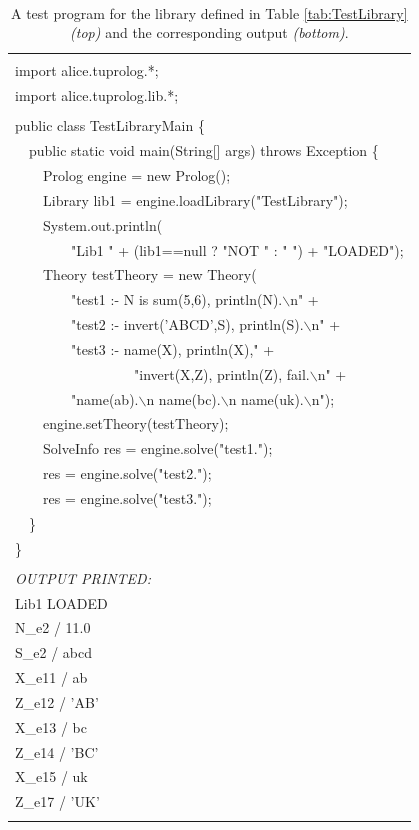 \begin{table}
    \begin{center}{\small\tt
    \begin{tabular}{p{12cm}}
     \hline\\
    import alice.tuprolog.*;\\
    import alice.tuprolog.lib.*;\\
    \\
    public class TestLibraryMain \{\\
    ~~public static void main(String[] args) throws Exception \{\\
	~~~~Prolog engine = new Prolog();\\
	~~~~Library lib1 = engine.loadLibrary("TestLibrary");\\
	~~~~System.out.println(\\
	~~~~~~~~"Lib1 " + (lib1==null ? "NOT " : " ") + "LOADED");\\
	~~~~Theory testTheory = new Theory(\\
	~~~~~~~~"test1 :- N is sum(5,6), println(N).$\backslash$n" +\\
	~~~~~~~~"test2 :- invert('ABCD',S), println(S).$\backslash$n" +\\
	~~~~~~~~"test3 :- name(X), println(X)," +\\
	~~~~~~~~~~~~~~~~~"invert(X,Z), println(Z), fail.$\backslash$n" +\\
	~~~~~~~~"name(ab).$\backslash$n name(bc).$\backslash$n name(uk).$\backslash$n");\\
	~~~~engine.setTheory(testTheory);\\
	~~~~SolveInfo res = engine.solve("test1.");\\
	~~~~res = engine.solve("test2.");\\
	~~~~res = engine.solve("test3.");\\
	~~\}\\
    \}\\
    \\
    \textrm{\textit{OUTPUT PRINTED:}}\\
    Lib1  LOADED\\
    N\_e2 / 11.0\\
    S\_e2 / abcd\\
    X\_e11 / ab\\
    Z\_e12 / 'AB'\\
    X\_e13 / bc\\
    Z\_e14 / 'BC'\\
    X\_e15 / uk\\
    Z\_e17 / 'UK'\\
    \\\hline
    \end{tabular}
    }\end{center}
    \caption{A test program for the library defined in Table \ref{tab:TestLibrary} \textit{(top)} and the corresponding output \textit{(bottom)}.}
    \label{tab:TestLibrary-Main}
\end{table}


